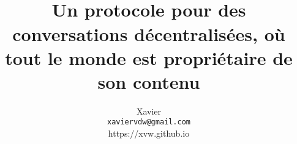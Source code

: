 \documentclass[a4paper,10pt]{article}
\title{
  \bsc{Phragment}\\
  \large{
    Un protocole pour des conversations décentralisées, où tout le monde
    est propriétaire de son contenu
  }
}
\date{}
\author{
  Xavier \bsc{Van de Woestyne}\\
  \texttt{xaviervdw@gmail.com}\\
  \small{https://xvw.github.io}
}
\begin{document}
\maketitle
\begin{abstract}

\end{abstract}



\newpage


\end{document}
